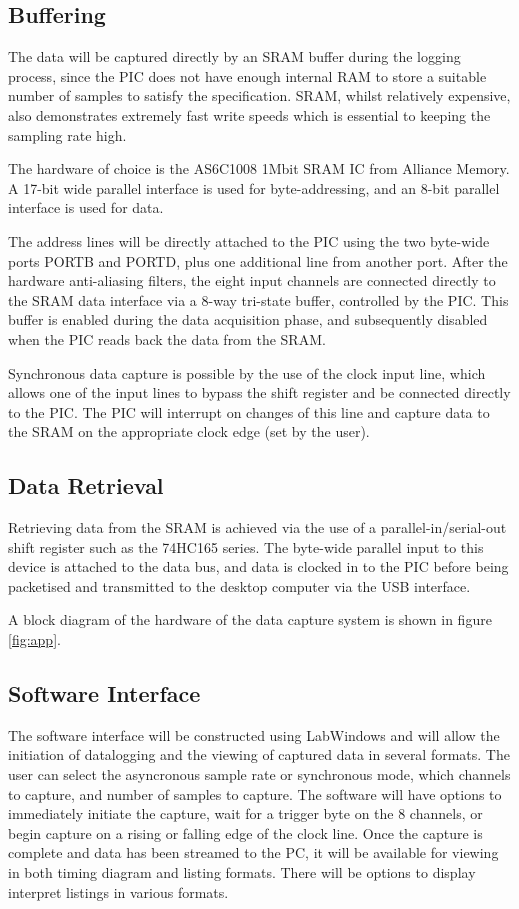 \documentclass[11pt]{article}
\begin{document}
\subsection{Buffering}
    The data will be captured directly by an SRAM buffer during the logging process, since the PIC does not have enough internal RAM to store a suitable number of samples to satisfy the specification. SRAM, whilst relatively expensive, also demonstrates extremely fast write speeds which is essential to keeping the sampling rate high.

    The hardware of choice is the AS6C1008 1Mbit SRAM IC from Alliance Memory. A 17-bit wide parallel interface is used for byte-addressing, and an 8-bit parallel interface is used for data.

    The address lines will be directly attached to the PIC using the two byte-wide ports PORTB and PORTD, plus one additional line from another port. After the hardware anti-aliasing filters, the eight input channels are connected directly to the SRAM data interface via a 8-way tri-state buffer, controlled by the PIC. This buffer is enabled during the data acquisition phase, and subsequently disabled when the PIC reads back the data from the SRAM.

    Synchronous data capture is possible by the use of the clock input line, which allows one of the input lines to bypass the shift register and be connected directly to the PIC.  The PIC will interrupt on changes of this line and capture data to the SRAM on the appropriate clock edge (set by the user).

\subsection{Data Retrieval}
    Retrieving data from the SRAM is achieved via the use of a parallel-in/serial-out shift register such as the 74HC165 series. The byte-wide parallel input to this device is attached to the data bus, and data is clocked in to the PIC before being packetised and transmitted to the desktop computer via the USB interface.

    A block diagram of the hardware of the data capture system is shown in figure \ref{fig:app}.
    
\subsection{Software Interface}
    The software interface will be constructed using LabWindows and will allow the initiation of datalogging and the viewing of captured data in several formats.  The user can select the asyncronous sample rate or synchronous mode, which channels to capture, and number of samples to capture.  The software will have options to immediately initiate the capture, wait for a trigger byte on the 8 channels, or begin capture on a rising or falling edge of the clock line.  Once the capture is complete and data has been streamed to the PC, it will be available for viewing in both timing diagram and listing formats.  There will be options to display interpret listings in various formats.
    
\end{document}
